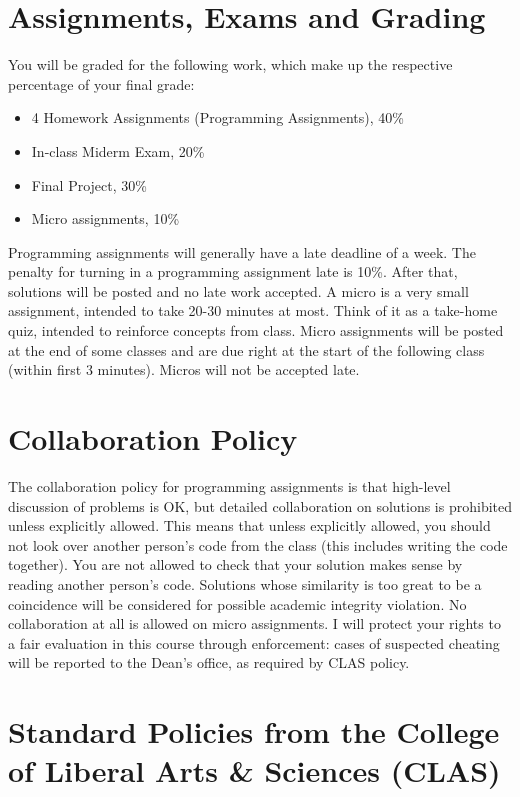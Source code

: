 \documentclass[10pt]{article}
\begin{document}
\section*{Assignments, Exams and Grading}

You will be graded for the following work, which make up the respective percentage of your final grade:
\begin{itemize}\itemsep-1pt
  \item 4 Homework Assignments (Programming Assignments), 40\%
  \item In-class Miderm Exam, 20\%
  \item Final Project, 30\%
  \item Micro assignments, 10\%
\end{itemize}
Programming assignments will generally have a late deadline of a week. The penalty for turning in a programming assignment late is 10\%. After that, solutions will be posted and no late work accepted. A micro is a very small assignment, intended to take 20-30 minutes at most. Think of it as a take-home quiz, intended to reinforce concepts from class. Micro assignments will be posted at the end of some classes and are due right at the start of the following class (within first 3 minutes). Micros will not be accepted late.


\section*{Collaboration Policy}

The collaboration policy for programming assignments is that high-level
discussion of problems is OK, but detailed collaboration on solutions is
prohibited unless explicitly allowed. This means that unless explicitly
allowed, you should not look over another person's code from the class (this
includes writing the code together). You are not allowed to check that your
solution makes sense by reading another person's code. Solutions whose
similarity is too great to be a coincidence will be considered for possible
academic integrity violation. No collaboration at all is allowed on micro
assignments. I will protect your rights to a fair evaluation in this course
through enforcement: cases of suspected cheating will be reported to the Dean's
office, as required by CLAS policy.


\section*{
  Standard Policies from the College of Liberal Arts \& Sciences (CLAS)
}
\end{document}
